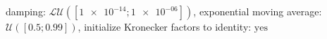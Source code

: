 damping: $\mathcal{LU}([\num[scientific-notation=true]{1e-14}; \num[scientific-notation=true]{1e-06}])$, exponential moving average: $\mathcal{U}([\num[scientific-notation=true]{0.5}; \num[scientific-notation=true]{0.99}])$, initialize Kronecker factors to identity: $\text{yes}$